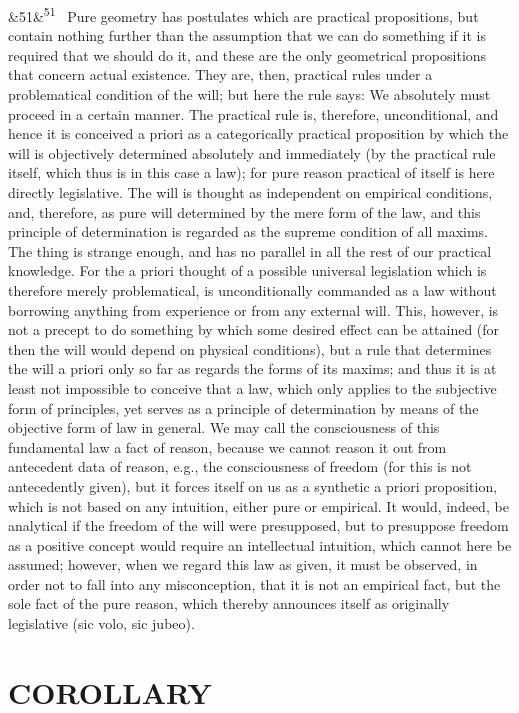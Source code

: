 \documentclass[12pt]{article}
\newcommand{\para}[1][]{\par\noindent\ifx&#1&\else\textsuperscript{\footnotesize #1}~\fi}
\begin{document}
\para[51] Pure geometry has postulates which are practical propositions, but contain nothing further than the assumption that we can do something if it is required that we should do it, and these are the only geometrical propositions that concern actual existence. They are, then, practical rules under a problematical condition of the will; but here the rule says: We absolutely must proceed in a certain manner. The practical rule is, therefore, unconditional, and hence it is conceived a priori as a categorically practical proposition by which the will is objectively determined absolutely and immediately (by the practical rule itself, which thus is in this case a law); for pure reason practical of itself is here directly legislative. The will is thought as independent on empirical conditions, and, therefore, as pure will determined by the mere form of the law, and this principle of determination is regarded as the supreme condition of all maxims. The thing is strange enough, and has no parallel in all the rest of our practical knowledge. For the a priori thought of a possible universal legislation which is therefore merely problematical, is unconditionally commanded as a law without borrowing anything from experience or from any external will. This, however, is not a precept to do something by which some desired effect can be attained (for then the will would depend on physical conditions), but a rule that determines the will a priori only so far as regards the forms of its maxims; and thus it is at least not impossible to conceive that a law, which only applies to the subjective form of principles, yet serves as a principle of determination by means of the objective form of law in general. We may call the consciousness of this fundamental law a fact of reason, because we cannot reason it out from antecedent data of reason, e.g., the consciousness of freedom (for this is not antecedently given), but it forces itself on us as a synthetic a priori proposition, which is not based on any intuition, either pure or empirical. It would, indeed, be analytical if the freedom of the will were presupposed, but to presuppose freedom as a positive concept would require an intellectual intuition, which cannot here be assumed; however, when we regard this law as given, it must be observed, in order not to fall into any misconception, that it is not an empirical fact, but the sole fact of the pure reason, which thereby announces itself as originally legislative (sic volo, sic jubeo).

\section*{COROLLARY}
\end{document}
